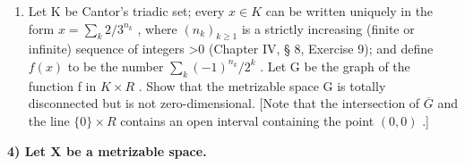\begin{enumerate}
\def\labelenumi{\alph{enumi})}
\setcounter{enumi}{1}
\tightlist
\item
  Let K be Cantor's triadic set; every \(x \in K\) can be written uniquely in the form \(x = \sum_{k} 2/3^{n_k}\) , where \((n_k)_{k \geqslant 1}\) is a strictly increasing (finite or infinite) sequence of integers \textgreater0 (Chapter IV, § 8, Exercise 9); and define \(f(x)\) to be the number \(\sum_{k} (-1)^{n_k}/2^k\) . Let G be the graph of the function f in \(K \times R\) . Show that the metrizable space G is totally disconnected but is not zero-dimensional. {[}Note that the intersection of \(\overline{G}\) and the line \(\{0\} \times R\) contains an open interval containing the point \((0, 0)\) .{]}
\end{enumerate}

\par\noindent\textbf{4) Let \(\mathbf{X}\) be a metrizable space.}\par

